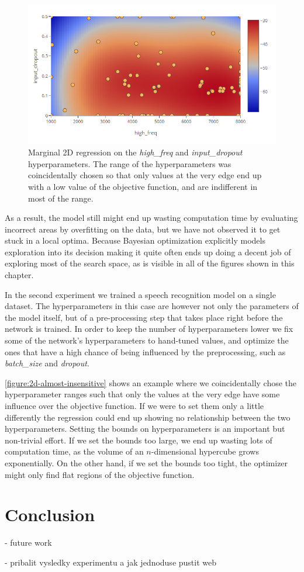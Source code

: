 \begin{figure}
	\begin{center}
		\includegraphics[width=1.0\textwidth]{images/2d-almost-insensitive.png}
		\caption{Marginal 2D regression on the \emph{high\_freq} and \emph{input\_dropout} hyperparameters. The range of the hyperparameters was coincidentally chosen so that only values at the very edge end up with a low value of the objective function, and are indifferent in most of the range.}
		\label{figure:2d-almost-insensitive}
	\end{center}
\end{figure}


As a result, the model still might end up wasting computation time by evaluating incorrect areas by overfitting on the data, but we have not observed it to get stuck in a local optima. Because Bayesian optimization explicitly models exploration into its decision making it quite often ends up doing a decent job of exploring most of the search space, as is visible in all of the figures shown in this chapter.

In the second experiment we trained a speech recognition model on a single dataset. The hyperparameters in this case are however not only the parameters of the model itself, but of a pre-processing step that takes place right before the network is trained. In order to keep the number of hyperparameters lower we fix some of the network's hyperparameters to hand-tuned values, and optimize the ones that have a high chance of being influenced by the preprocessing, such as \emph{batch\_size} and \emph{dropout}.

\autoref{figure:2d-almost-insensitive} shows an example where we coincidentally chose the hyperparameter ranges such that only the values at the very edge have some influence over the objective function. If we were to set them only a little differently the regression could end up showing no relationship between the two hyperparameters. Setting the bounds on hyperparameters is an important but non-trivial effort. If we set the bounds too large, we end up wasting lots of computation time, as the volume of an $n$-dimensional hypercube grows exponentially. On the other hand, if we set the bounds too tight, the optimizer might only find flat regions of the objective function.




\chapter{Conclusion}

- future work

- pribalit vysledky experimentu a jak jednoduse pustit web
